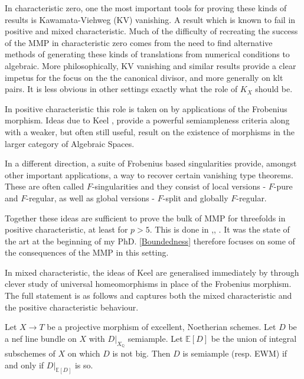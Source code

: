 \documentclass[a4paper,12pt]{book}
\begin{document}
	In characteristic zero, one the most important tools for proving these kinds of results is Kawamata-Viehweg (KV) vanishing. A result which is known to fail in positive and mixed characteristic. Much of the difficulty of recreating the success of the MMP in characteristic zero comes from the need to find alternative methods of generating these kinds of translations from numerical conditions to algebraic. More philosophically, KV vanishing and similar results provide a clear impetus for the focus on the the canonical divisor, and more generally on klt pairs. It is less obvious in other settings exactly what the role of $K_{X}$ should be.
	
	In positive characteristic this role is taken on by applications of the Frobenius morphism. Ideas due to Keel \cite{Keel}, provide a powerful semiampleness criteria along with a weaker, but often still useful, result on the existence of morphisms in the larger category of Algebraic Spaces. 
	
	In a different direction, a suite of Frobenius based singularities provide, amongst other important applications, a way to recover certain vanishing type theorems. These are often called $F$-singularities and they consist of local versions - $F$-pure and $F$-regular, as well as global versions - $F$-split and globally $F$-regular.
		
	Together these ideas are sufficient to prove the bulk of MMP for threefolds in positive characteristic, at least for $p > 5$. This is done in \cite{HX15},\cite{Bir16}, \cite{BW17}. It was the state of the art at the beginning of my PhD. \autoref{Boundedness} therefore focuses on some of the consequences of the MMP in this setting.
	
	In mixed characteristic, the ideas of Keel are generalised immediately by \cite{witaszek2020keels} through clever study of universal homeomorphisms in place of the Frobenius morphism. The full statement is as follows and captures both the mixed characteristic and the positive characteristic behaviour.
	
	\begin{theorem*}\cite[Theorem 1.2]{witaszek2020keels}
		Let $X \to T$ be a projective morphism of excellent, Noetherian schemes. Let $D$ be a nef line bundle on $X$ with $D|_{X_{\mathbb{Q}}}$ semiample. Let $\mathbb{E}[D]$ be the union of integral subschemes of $X$ on which $D$ is not big. Then $D$ is semiample (resp. EWM) if and only if $D|_{\mathbb{E}[D]}$ is so.
	\end{theorem*}
	
\end{document}
